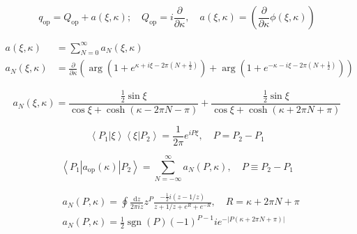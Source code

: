 \documentclass[main.tex]{subfiles}
\begin{document}
\begin{equation}\label{16.31}
	q_{\mathrm{op}}=Q_{\mathrm{op}}+a(\xi, \kappa) ; \quad Q_{\mathrm{op}}=i \frac{\partial}{\partial \kappa}, \quad a(\xi, \kappa)=\left(\frac{\partial}{\partial \kappa} \phi(\xi, \kappa)\right)
\end{equation}



\begin{equation}\label{16.32}
	\begin{aligned}
a(\xi, \kappa) &=\sum_{N=0}^{\infty} a_{N}(\xi, \kappa) \\
a_{N}(\xi, \kappa) &=\frac{\partial}{\partial \kappa}\left(\arg \left(1+e^{\kappa+i \xi-2 \pi\left(N+\frac{1}{2}\right)}\right)+\arg \left(1+e^{-\kappa-i \xi-2 \pi\left(N+\frac{1}{2}\right)}\right)\right)
\end{aligned}
\end{equation}



\begin{equation}\label{16.33}
	a_{N}(\xi, \kappa)=\frac{\frac{1}{2} \sin \xi}{\cos \xi+\cosh (\kappa-2 \pi N-\pi)}+\frac{\frac{1}{2} \sin \xi}{\cos \xi+\cosh (\kappa+2 \pi N+\pi)}
\end{equation}



\begin{equation}\label{16.34}
	\left\langle P_{1} | \xi\right\rangle\left\langle\xi | P_{2}\right\rangle=\frac{1}{2 \pi} e^{i P \xi}, \quad P=P_{2}-P_{1}
\end{equation}



\begin{equation}\label{16.35}
	\left\langle P_{1}\left|a_{\mathrm{op}}(\kappa)\right| P_{2}\right\rangle=\sum_{N=-\infty}^{\infty} a_{N}(P, \kappa), \quad P \equiv P_{2}-P_{1}
\end{equation}


\begin{equation}\label{16.36}
	\begin{aligned}
&a_{N}(P, \kappa)=\oint \frac{\mathrm{d} z}{2 \pi i z} z^{P} \frac{-\frac{1}{2} i(z-1 / z)}{z+1 / z+e^{R}+e^{-R}}, \quad R=\kappa+2 \pi N+\pi\\
&a_{N}(P, \kappa)=\frac{1}{2} \operatorname{sgn}(P)(-1)^{P-1} i e^{-|P(\kappa+2 \pi N+\pi)|}
\end{aligned}
\end{equation}
\end{document}
